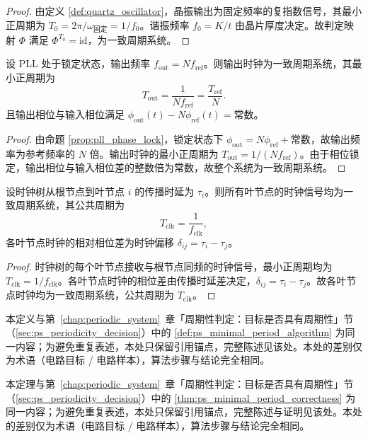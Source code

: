 \begin{proof}
由定义 \ref{def:quartz_oscillator}，晶振输出为固定频率的复指数信号，其最小正周期为 $T_0=2\pi/\omega_{\text{固定}}=1/f_0$。谐振频率 $f_0=K/t$ 由晶片厚度决定。故判定映射 $\Phi$ 满足 $\Phi^{T_0}=\mathrm{id}$，为一致周期系统。
\end{proof}

\begin{lemma}\label{lem:pll_periodic}
设 PLL 处于锁定状态，输出频率 $f_{\text{out}}=Nf_{\text{ref}}$。则输出时钟为一致周期系统，其最小正周期为
\[
T_{\text{out}}=\frac{1}{Nf_{\text{ref}}}=\frac{T_{\text{ref}}}{N}.
\]
且输出相位与输入相位满足 $\phi_{\text{out}}(t)-N\phi_{\text{ref}}(t)=\text{常数}$。
\end{lemma}

\begin{proof}
由命题 \ref{prop:pll_phase_lock}，锁定状态下 $\phi_{\text{out}}=N\phi_{\text{ref}}+\text{常数}$，故输出频率为参考频率的 $N$ 倍。输出时钟的最小正周期为 $T_{\text{out}}=1/(Nf_{\text{ref}})$。由于相位锁定，输出相位与输入相位差的整数倍为常数，故整个系统为一致周期系统。
\end{proof}

\begin{lemma}[时钟树传播的周期判定]\label{lem:clock_tree_periodic}
设时钟树从根节点到叶节点 $i$ 的传播时延为 $\tau_i$。则所有叶节点的时钟信号均为一致周期系统，其公共周期为
\[
T_{\text{clk}}=\frac{1}{f_{\text{clk}}},
\]
各叶节点时钟的相对相位差为时钟偏移 $\delta_{ij}=\tau_i-\tau_j$。
\end{lemma}

\begin{proof}
时钟树的每个叶节点接收与根节点同频的时钟信号，最小正周期均为 $T_{\text{clk}}=1/f_{\text{clk}}$。各叶节点时钟的相位差由传播时延差决定，$\delta_{ij}=\tau_i-\tau_j$。故各叶节点时钟均为一致周期系统，公共周期为 $T_{\text{clk}}$。
\end{proof}

\begin{definition}[电路最小正周期算法]\label{def:circuit_minimal_period_algorithm}
本定义与第~\ref{chap:periodic_system}~章「周期性判定：目标是否具有周期性」节（\cref{sec:ps_periodicity_decision}）中的 \cref{def:ps_minimal_period_algorithm} 为同一内容；为避免重复表述，本处只保留引用锚点，完整陈述见该处。本处的差别仅为术语（电路目标 / 电路样本），算法步骤与结论完全相同。
\end{definition}

\begin{theorem}[电路最小正周期算法的正确性]\label{thm:circuit_minimal_period_correctness}
本定理与第~\ref{chap:periodic_system}~章「周期性判定：目标是否具有周期性」节（\cref{sec:ps_periodicity_decision}）中的 \cref{thm:ps_minimal_period_correctness} 为同一内容；为避免重复表述，本处只保留引用锚点，完整陈述与证明见该处。本处的差别仅为术语（电路目标 / 电路样本），算法步骤与结论完全相同。
\end{theorem}

